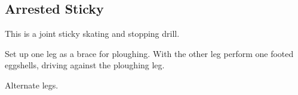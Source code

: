 \subsection*{Arrested Sticky}
\label{drill:stopping/arrested_sticky}

This is a joint sticky skating and stopping drill.

Set up one leg as a brace for ploughing.
With the other leg perform one footed eggshells, driving against the ploughing leg.

Alternate legs. 
